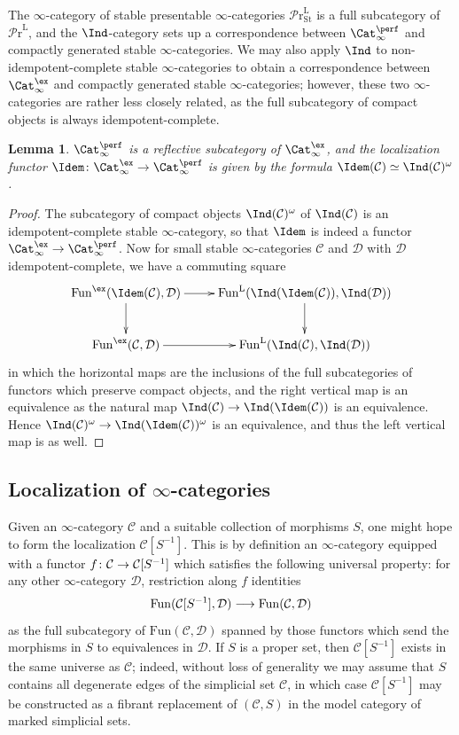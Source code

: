 \documentclass{amsart}
\renewcommand{\to}{\mathchoice{\longrightarrow}{\rightarrow}{\rightarrow}{\rightarrow}}
\let\catsymbfont\mathcal
\newcommand{\aC}{{\catsymbfont{C}}}
\newcommand{\aD}{{\catsymbfont{D}}}
\renewcommand{\L}{\mathrm{L}}
\newcommand{\stabcat}{\Cat_\i^{\ex}}
\newcommand{\idemstabcat}{\Cat_\i^{\perf}}
\newcommand{\prcat}{{\mathcal{P}\mathrm{r}}^\mathrm{L}}
\newcommand{\stabprcat}{{{\mathcal{P}\mathrm{r}}^{\mathrm{L}}_\mathrm{St}}}
\newcommand{\Fun}{\mathrm{Fun}} %
\renewcommand{\i}{\infty}
\numberwithin{equation}{section}
\newtheorem{lemma}[equation]{Lemma}
\theoremstyle{definition}
\begin{document}
The $\i$-category of stable presentable
$\i$-categories $\stabprcat$ is a full subcategory of $\prcat$, and
the $\Ind$-category sets up a correspondence between $\idemstabcat$
and compactly generated stable $\i$-categories.  We may also apply
$\Ind$ to non-idempotent-complete stable $\i$-categories to obtain a
correspondence between $\stabcat$ and compactly generated stable
$\i$-categories; however, these two $\i$-categories are rather less
closely related, as the full subcategory of compact objects is always
idempotent-complete.

\begin{lemma}
$\idemstabcat$ is a reflective subcategory of $\stabcat$, and the
localization functor $\Idem\colon\stabcat\to\idemstabcat$ is given by
the formula $\Idem(\aC)\simeq\Ind(\aC)^\omega$.
\end{lemma}

\begin{proof}
The subcategory of compact objects $\Ind(\aC)^\omega$ of
$\Ind(\aC)$ is an idempotent-complete stable $\i$-category, so that
$\Idem$ is indeed a functor $\stabcat\to\idemstabcat$.  Now for small
stable $\i$-categories $\aC$ and $\aD$ with $\aD$ idempotent-complete,
we have a commuting square
\[
\xymatrix{
\Fun^{\ex}(\Idem(\aC),\aD)\ar[r]\ar[d]
& \Fun^{\L}(\Ind(\Idem(\aC)),\Ind(\aD))\ar[d] \\
\Fun^{\ex}(\aC,\aD)\ar[r] & \Fun^{\L}(\Ind(\aC),\Ind(\aD))}
\]
in which the horizontal maps are the inclusions of the full
subcategories of functors which preserve compact objects, and the
right vertical map is an equivalence as the natural map
$\Ind(\aC)\to\Ind(\Idem(\aC))$ is an equivalence.  Hence
$\Ind(\aC)^\omega\to\Ind(\Idem(\aC))^\omega$ is an equivalence, and
thus the left vertical map is as well.
\end{proof}

\subsection{Localization of $\i$-categories}\label{sec:bousloc}

Given an $\i$-category $\aC$ and a suitable collection of morphisms 
$S$, one might hope to form the localization $\aC [S^{-1}]$.
This is by definition an $\i$-category equipped with a functor
$f\colon \aC\to\aC[S^{-1}]$ which satisfies the following universal
property: for any other $\i$-category $\aD$, restriction along $f$
identities 
\[
\Fun(\aC[S^{-1}],\aD)\to\Fun(\aC,\aD)
\]
as the full subcategory of $\Fun(\aC,\aD)$ spanned by those functors
which send the morphisms in $S$ to equivalences in $\aD$.  If $S$ is a
proper set, then $\aC[S^{-1}]$ exists in the same universe as $\aC$;
indeed, without loss of generality we may assume that $S$ contains all
degenerate edges of the simplicial set $\aC$, in which case
$\aC[S^{-1}]$ may be constructed as a fibrant replacement of $(\aC,S)$
in the model category of marked simplicial sets.
\end{document}
